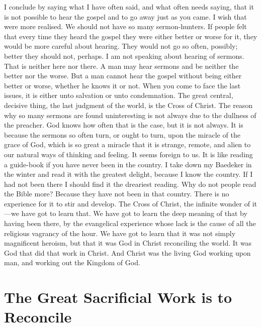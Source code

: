 \documentclass[12pt,a5paper,twoside,titlepage]{book}
\begin{document}
I conclude by saying what I have often said, 
and what often needs saying, that it is not 
possible to hear the gospel and to go away just 
as you came. I wish that were more realised. 
We should not have so many sermon-hunters. 
If people felt that every time they heard the 
gospel they were either better or worse for it, 
they would be more careful about hearing. 
They would not go so often, possibly; better they 
should not, perhaps. I am not speaking about 
hearing of sermons. That is neither here nor 
there. A man may hear sermons and be neither 
the better nor the worse. But a man cannot 
hear the gospel without being either better or 
worse, whether he knows it or not. When you 
come to face the last issues, it is either unto 
salvation or unto condemnation. The great 
central, decisive thing, the last judgment of the 
world, is the Cross of Christ. The reason why 
so many sermons are found uninteresting is not 
always due to the dullness of the preacher. God 
knows how often that is the case, but it is not 
always. It is because the sermons so often turn, 
or ought to turn, upon the miracle of the grace 
of God, which is so great a miracle that it is 
strange, remote, and alien to our natural ways 
of thinking and feeling. It seems foreign to us. 
It is like reading a guide-book if you have never 
been in the country. I take down my Baedeker 
in the winter and read it with the greatest 
delight, because I know the country. If I had 
not been there I should find it the dreariest reading. 
Why do not people read the Bible more? 
Because they have not been in that country. 
There is no experience for it to stir and develop. 
The Cross of Christ, the infinite wonder of it---we 
have got to learn that. We have got to 
learn the deep meaning of that by having been 
there, by the evangelical experience whose lack 
is the cause of all the religious vagrancy of the 
hour. We have got to learn that it was not 
simply magnificent heroism, but that it was God 
in Christ reconciling the world. It was God 
that did that work in Christ. And Christ was 
the living God working upon man, and working 
out the Kingdom of God. 

\chapter{The Great Sacrificial Work is to Reconcile} 
\end{document}

